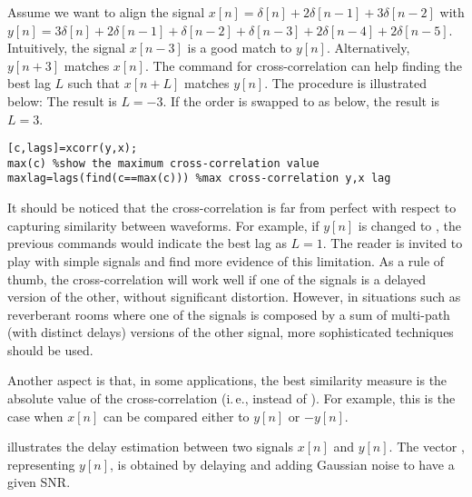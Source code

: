 Assume we want to align the signal $x[n]=\delta[n]+2\delta[n-1]+3\delta[n-2]$ with $y[n]=3\delta[n]+2\delta[n-1]+\delta[n-2]+\delta[n-3]+2\delta[n-4]+2\delta[n-5]$. Intuitively, the signal $x[n-3]$ is a good match to $y[n]$. Alternatively, $y[n+3]$ matches $x[n]$. The {\matlab} command  for cross-correlation can help finding the best lag $L$ such that $x[n+L]$ matches $y[n]$. The procedure is illustrated below:
The result is $L=-3$. If the order is swapped to  as below, the result is $L=3$.
\begin{lstlisting}
[c,lags]=xcorr(y,x); 
max(c) %show the maximum cross-correlation value
maxlag=lags(find(c==max(c))) %max cross-correlation y,x lag
\end{lstlisting}

It should be noticed that the cross-correlation is far from perfect with respect to capturing similarity between waveforms. For example, if $y[n]$ is changed to , the previous commands would indicate the best lag as $L=1$. The reader is invited to play with simple signals and find more evidence of this limitation.
As a rule of thumb, the cross-correlation will work well if one of the signals is a delayed version of the other, without significant distortion. However, in situations such as reverberant rooms where one of the signals is composed by a sum of multi-path (with distinct delays) versions of the other signal, more sophisticated techniques should be used.

Another aspect is that, in some applications, the best similarity measure is the absolute value of the cross-correlation (i.\,e.,  instead of ). For example, this is the case when $x[n]$ can be compared either to $y[n]$ or $-y[n]$.

 illustrates the delay estimation between two signals $x[n]$ and $y[n]$. The vector , representing $y[n]$, is obtained by delaying  and adding Gaussian noise to have a given SNR.

